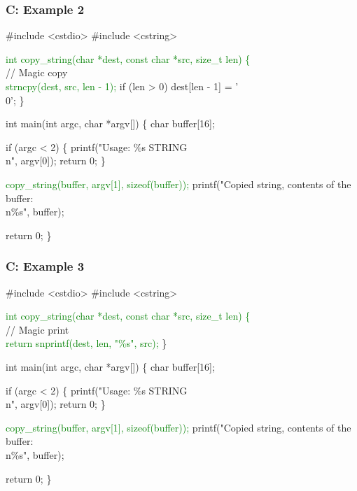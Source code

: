 \documentclass[usenames,dvipsnames]{beamer}
\newcommand{\greenalert}[1] {\alert{\textcolor{green}{#1}}}
\begin{document}
\begin{frame}
\frametitle{C: Example 2}
\tiny
\begin{semiverbatim}
\#include <cstdio>
\#include <cstring>

\greenalert{int copy\_string(char *dest, const char *src, size\_t len) \{} 
  \\ // Magic copy \\
  \greenalert{strncpy(dest, src, len - 1);}
  if (len > 0)
    dest[len - 1] = '\\0';
\}

int main(int argc, char *argv[]) \{
  char buffer[16];

  if (argc < 2) \{
    printf("Usage: \%s STRING\\n", argv[0]);
    return 0;
  \}

  \greenalert{copy\_string(buffer, argv[1], sizeof(buffer));}
  printf("Copied string, contents of the buffer:\\n\%s", buffer);

  return 0;
\}
\end{semiverbatim}
\end{frame}

\begin{frame}
\frametitle{C: Example 3}
\tiny
\begin{semiverbatim}
\#include <cstdio>
\#include <cstring>

\greenalert{int copy\_string(char *dest, const char *src, size\_t len) \{} 
  \\ // Magic print \\
  \greenalert{return snprintf(dest, len, "\%s", src);}
\}

int main(int argc, char *argv[]) \{
  char buffer[16];

  if (argc < 2) \{
    printf("Usage: \%s STRING\\n", argv[0]);
    return 0;
  \}

  \greenalert{copy\_string(buffer, argv[1], sizeof(buffer));}
  printf("Copied string, contents of the buffer:\\n\%s", buffer);

  return 0;
\}
\end{semiverbatim}
\end{frame}
\end{document}
